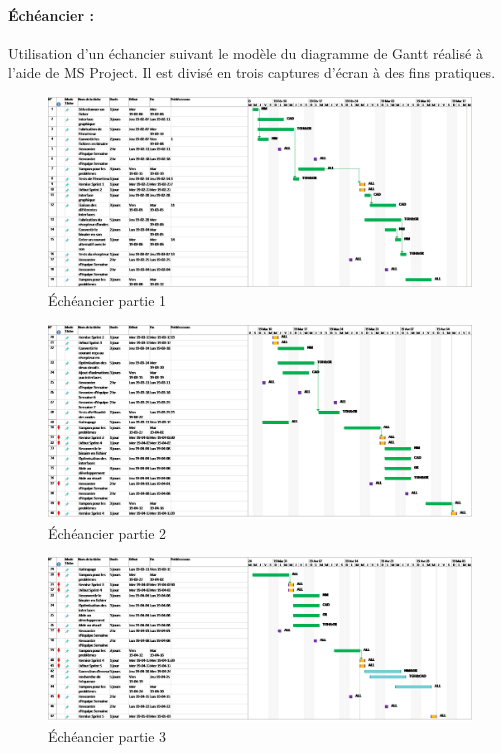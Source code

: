 \paragraph{Échéancier :}
Utilisation d'un échancier suivant le modèle du diagramme de Gantt réalisé à l'aide de MS Project. Il est divisé en trois captures d'écran à des fins pratiques.

\begin{figure}[ht!]
    \centering
    \caption{Échéancier partie 1}
    \includegraphics[width=0.8\linewidth]{images/echeancier/echeancier_sprint3_part1.png}
\end{figure}

\begin{figure}[ht!]
    \centering
    \caption{Échéancier partie 2}
    \includegraphics[width=0.8\linewidth]{images/echeancier/echeancier_sprint5_part2.png}
\end{figure}

\begin{figure}[ht!]
    \centering
    \caption{Échéancier partie 3}
    \includegraphics[width=0.8\linewidth]{images/echeancier/echeancier_sprint5_part3.png}
\end{figure}